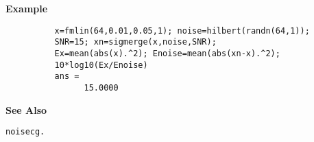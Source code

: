 {\bf \large \sf Example}\begin{verbatim}
          x=fmlin(64,0.01,0.05,1); noise=hilbert(randn(64,1));
          SNR=15; xn=sigmerge(x,noise,SNR);
          Ex=mean(abs(x).^2); Enoise=mean(abs(xn-x).^2);
          10*log10(Ex/Enoise)
          ans = 
                15.0000

\end{verbatim}
\vspace*{.5cm}

{\bf \large \sf See Also}\\
\hspace*{1.5cm}
\begin{minipage}[t]{13.5cm}
\begin{verbatim}
noisecg.
\end{verbatim}
\end{minipage}
